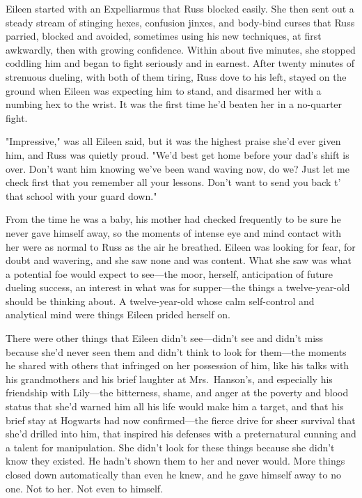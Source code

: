 Eileen started with an Expelliarmus that Russ blocked easily. She then sent out a steady stream of stinging hexes, confusion jinxes, and body-bind curses that Russ parried, blocked and avoided, sometimes using his new techniques, at first awkwardly, then with growing confidence. Within about five minutes, she stopped coddling him and began to fight seriously and in earnest. After twenty minutes of strenuous dueling, with both of them tiring, Russ dove to his left, stayed on the ground when Eileen was expecting him to stand, and disarmed her with a numbing hex to the wrist. It was the first time he'd beaten her in a no-quarter fight.

"Impressive," was all Eileen said, but it was the highest praise she'd ever given him, and Russ was quietly proud. "We'd best get home before your dad's shift is over. Don't want him knowing we've been wand waving now, do we? Just let me check first that you remember all your lessons. Don't want to send you back t' that school with your guard down."

From the time he was a baby, his mother had checked frequently to be sure he never gave himself away, so the moments of intense eye and mind contact with her were as normal to Russ as the air he breathed. Eileen was looking for fear, for doubt and wavering, and she saw none and was content. What she saw was what a potential foe would expect to see—the moor, herself, anticipation of future dueling success, an interest in what was for supper—the things a twelve-year-old should be thinking about. A twelve-year-old whose calm self-control and analytical mind were things Eileen prided herself on.

There were other things that Eileen didn't see—didn't see and didn't miss because she'd never seen them and didn't think to look for them—the moments he shared with others that infringed on her possession of him, like his talks with his grandmothers and his brief laughter at Mrs.~Hanson's, and especially his friendship with Lily—the bitterness, shame, and anger at the poverty and blood status that she'd warned him all his life would make him a target, and that his brief stay at Hogwarts had now confirmed—the fierce drive for sheer survival that she'd drilled into him, that inspired his defenses with a preternatural cunning and a talent for manipulation. She didn't look for these things because she didn't know they existed. He hadn't shown them to her and never would. More things closed down automatically than even he knew, and he gave himself away to no one. Not to her. Not even to himself.

